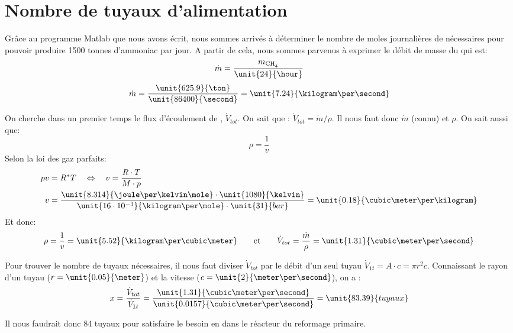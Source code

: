 \section{Nombre de tuyaux d'alimentation}

Grâce au programme Matlab que nous avons écrit, nous sommes arrivés à déterminer le nombre de moles journalières de  nécessaires pour pouvoir produire 1500 tonnes d'ammoniac par jour. A partir de cela, nous sommes parvenus à exprimer le débit de masse du  qui est:
    $$\dot{m}=\frac{m_{\ce{CH4}}}{\unit{24}{\hour}}$$
    $$\dot{m}=\frac{\unit{625.9}{\ton}}{\unit{86400}{\second}}=\unit{7.24}{\kilogram\per\second}$$

On cherche dans un premier temps le flux d'écoulement de , $\dot{V}_{tot}$. On sait que :
$\dot{V}_{tot}={\dot{m}}/{\rho}$.
Il nous faut donc $\dot{m}$ (connu) et $\rho$. On sait aussi que:
\[ \rho = \frac{1}{v} \]
Selon la loi des gaz parfaits:
\begin{align*}
    pv &= R^{*}T \quad\Leftrightarrow\quad v = \frac{R\cdot T}{M\cdot p} \\
    v &= \frac{\unit{8.314}{\joule\per\kelvin\mole}\cdot\unit{1080}{\kelvin}}{\unit{16\cdot10^{-3}}{\kilogram\per\mole}\cdot\unit{31}{bar}}=\unit{0.18}{\cubic\meter\per\kilogram}
\end{align*}
Et donc:
\[
    \rho = \frac{1}{v} = \unit{5.52}{\kilogram\per\cubic\meter}
    \qquad\text{et}\qquad
    \dot{V}_{tot} = \frac{\dot{m}}{\rho}=\unit{1.31}{\cubic\meter\per\second}
\]

Pour trouver le nombre de tuyaux nécessaires, il nous faut diviser $\dot{V}_{tot}$ par le débit d'un seul tuyau $\dot{V}_{1t} = A\cdot c = \pi r^2 c$. Connaissant le rayon d'un tuyau ($r=\unit{0.05}{\meter}$) et la vitesse ($c=\unit{2}{\meter\per\second}$), on a :
\[
    x = \frac{\dot{V}_{tot}}{\dot{V}_{1t}}
      = \frac{\unit{1.31}{\cubic\meter\per\second}}{\unit{0.0157}{\cubic\meter\per\second}}
      = \unit{83.39}{tuyaux}
\]

Il nous faudrait donc 84 tuyaux pour satisfaire le besoin en  dans le réacteur du reformage primaire.
